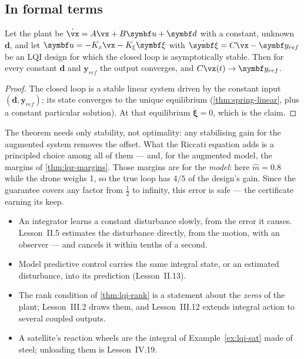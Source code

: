 \subsection{In formal terms}

\begin{theorem}
\label{thm:lqi-zero}
Let the plant be $\dot{\vx} = A\vx + B\symbf u + \symbf d$ with a constant, unknown $\symbf d$, and let $\symbf u = -K_x\vx - K_\xi\symbf\xi$ with $\dot{\symbf\xi} = C\vx - \symbf y_{ref}$ be an LQI design for which the closed loop is asymptotically stable. Then for every constant $\symbf d$ and $\symbf y_{ref}$ the output converges, and $C\vx(t) \to \symbf y_{ref}$.
\end{theorem}
\begin{proof}
The closed loop is a stable linear system driven by the constant input $(\symbf d, \symbf y_{ref})$; its state converges to the unique equilibrium (\cref{thm:spring-linear}, plus a constant particular solution). At that equilibrium $\dot{\symbf\xi} = 0$, which is the claim.
\end{proof}

The theorem needs only stability, not optimality: any stabilising gain for the augmented system removes the offset. What the Riccati equation adds is a principled choice among all of them — and, for the augmented model, the margins of \cref{thm:lqr-margins}. Those margins are for the \emph{model}: here $\hat m = 0.8$ while the drone weighs 1, so the true loop has $4/5$ of the design's gain. Since the guarantee covers any factor from $\tfrac12$ to infinity, this error is safe — the certificate earning its keep.

\begin{lookahead}
\begin{itemize}[leftmargin=1.2em]
  \item An integrator learns a constant disturbance slowly, from the error it causes. Lesson~II.5 estimates the disturbance directly, from the motion, with an observer — and cancels it within tenths of a second.
  \item Model predictive control carries the same integral state, or an estimated disturbance, into its prediction (Lesson~II.13).
  \item The rank condition of \cref{thm:lqi-rank} is a statement about the \emph{zeros} of the plant; Lesson~III.2 draws them, and Lesson~III.12 extends integral action to several coupled outputs.
  \item A satellite's reaction wheels are the integral of Example~\ref{ex:lqi-sat} made of steel; unloading them is Lesson~IV.19.
\end{itemize}
\end{lookahead}

